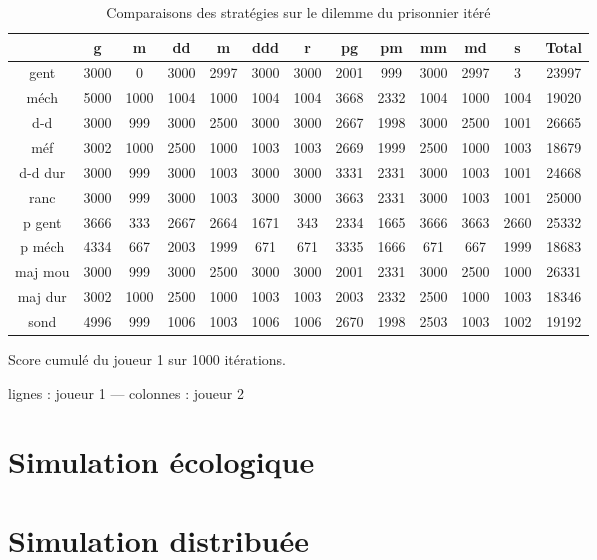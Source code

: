 \documentclass[10pt]{article}
\begin{document}
\begin{table}
\caption[Comparaison des stratégies]{Comparaisons des stratégies sur le dilemme du prisonnier itéré}
\label{strattable}
\begin{center}
\begin{tabular}{|c|cccccccccccc|}
\hline
& g & m & dd & m & ddd & r & pg & pm & mm & md & s & Total \\ \hline 
gent & 3000& 0& 3000& 2997& 3000& 3000& 2001& 999& 3000& 2997& 3& 23997\\
méch & 5000& 1000& 1004& 1000& 1004& 1004& 3668& 2332& 1004& 1000& 1004& 19020\\
d-d & 3000& 999& 3000& 2500& 3000& 3000& 2667& 1998& 3000& 2500& 1001& 26665\\
méf & 3002& 1000& 2500& 1000& 1003& 1003& 2669& 1999& 2500& 1000& 1003& 18679\\
d-d dur & 3000& 999& 3000& 1003& 3000& 3000& 3331& 2331& 3000& 1003& 1001& 24668\\
ranc & 3000& 999& 3000& 1003& 3000& 3000& 3663& 2331& 3000& 1003& 1001& 25000\\
p gent & 3666& 333& 2667& 2664& 1671& 343& 2334& 1665& 3666& 3663& 2660& 25332\\
p méch & 4334& 667& 2003& 1999& 671& 671& 3335& 1666& 671& 667& 1999& 18683\\
maj mou & 3000& 999& 3000& 2500& 3000& 3000& 2001& 2331& 3000& 2500& 1000& 26331\\
maj dur & 3002& 1000& 2500& 1000& 1003& 1003& 2003& 2332& 2500& 1000& 1003& 18346\\
sond & 4996& 999& 1006& 1003& 1006& 1006& 2670& 1998& 2503& 1003& 1002& 19192\\
\hline
\end{tabular}
\end{center}
Score cumulé du joueur 1 sur 1000 itérations.

lignes : joueur 1 --- colonnes : joueur 2
\end{table}

\section{Simulation écologique}

\section{Simulation distribuée}
\end{document}
